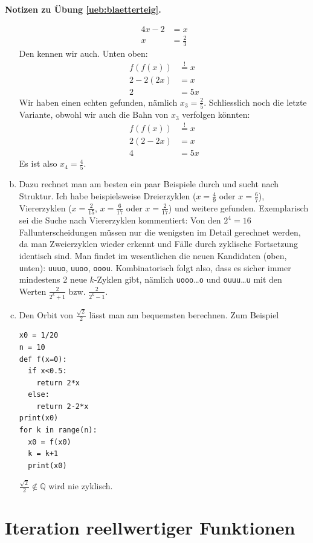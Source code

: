 \documentclass[%
11pt,%
twoside,%
titlepage,%
german,%
headsepline%
]{scrartcl}
\newcommand{\concatueb}[1]{ueb:#1}%
\newcommand{\concatlsg}[1]{lsg:#1}%
\newenvironment{lsg}[1]{%
    \par\noindent\textbf{Notizen zu Übung \ref{\concatueb{#1}}.}%
    \label{\concatlsg{#1}}
}{%
    \par%
}
\begin{document}
\begin{lsg}{blaetterteig}
\begin{enumerate}[a)]
\begin{align*}
4x-2 &= x\\
x &= \frac{2}{3}
\end{align*}
Den kennen wir auch. Unten oben:
\begin{align*}
f(f(x)) &\stackrel{!}{=} x\\
2-2(2x) &= x\\
2 &= 5x
\end{align*}
Wir haben einen echten gefunden, n\"amlich $x_{3}=\frac{2}{5}$. Schliesslich noch die letzte Variante, obwohl wir auch die Bahn von $x_{3}$ verfolgen k\"onnten:
\begin{align*}
f(f(x)) &\stackrel{!}{=} x\\
2(2-2x) &= x\\
4 &= 5x
\end{align*}
Es ist also $x_{4}=\frac{4}{5}$.
\item Dazu rechnet man am besten ein paar Beispiele durch und sucht nach Struktur. Ich habe beispielsweise Dreierzyklen ($x=\frac{4}{9}$ oder $x=\frac{6}{7}$), Viererzyklen ($x=\frac{2}{15}$, $x=\frac{6}{17}$ oder $x=\frac{2}{17}$) und weitere gefunden. Exemplarisch sei die Suche nach Viererzyklen kommentiert: Von den $2^{4}=16$ Fallunterscheidungen m\"ussen nur die wenigsten im Detail gerechnet werden, da man Zweierzyklen wieder erkennt und F\"alle durch zyklische Fortsetzung identisch sind. Man findet im wesentlichen die neuen Kandidaten (\texttt{o}ben, \texttt{u}nten): \texttt{uuuo}, \texttt{uuoo}, \texttt{ooou}. Kombinatorisch folgt also, dass es sicher immer mindestens 2 neue $k$-Zyklen gibt, n\"amlich \texttt{uooo}\dots\texttt{o} und \texttt{ouuu}\dots\texttt{u} mit den Werten $\frac{2}{2^{k}+1}$ bzw. $\frac{2}{2^{k}-1}$.
\item Den Orbit von $\frac{\sqrt{2}}{2}$ l\"asst man am bequemsten berechnen. Zum Beispiel
\begin{lstlisting}
x0 = 1/20
n = 10
def f(x=0):
  if x<0.5:
    return 2*x
  else:
    return 2-2*x
print(x0)
for k in range(n):
  x0 = f(x0)
  k = k+1
  print(x0)
\end{lstlisting}
$\frac{\sqrt{2}}{2}\not\in\mathbb{Q}$ wird nie zyklisch.
\end{enumerate}
\end{lsg}

\clearpage

\section{Iteration reellwertiger Funktionen}
\end{document}
